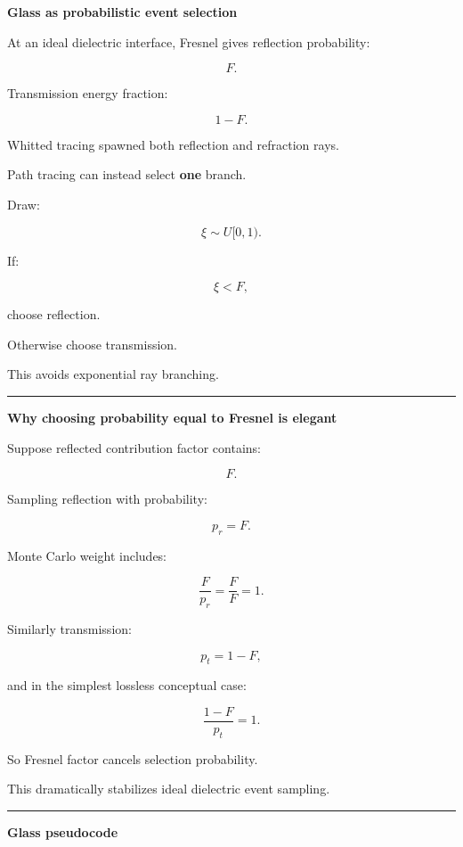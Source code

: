 \textbf{Glass as probabilistic event selection}

At an ideal dielectric interface, Fresnel gives reflection probability:

\[
F.
\]

Transmission energy fraction:

\[
1-F.
\]

Whitted tracing spawned both reflection and refraction rays.

Path tracing can instead select \textbf{one} branch.

Draw:

\[
\xi\sim U[0,1).
\]

If:

\[
\xi<F,
\]

choose reflection.

Otherwise choose transmission.

This avoids exponential ray branching.

\begin{center}\rule{0.5\linewidth}{0.5pt}\end{center}

\textbf{Why choosing probability equal to Fresnel is elegant}

Suppose reflected contribution factor contains:

\[
F.
\]

Sampling reflection with probability:

\[
p_r=F.
\]

Monte Carlo weight includes:

\[
\frac{F}{p_r}
=
\frac{F}{F}
=
1.
\]

Similarly transmission:

\[
p_t=1-F,
\]

and in the simplest lossless conceptual case:

\[
\frac{1-F}{p_t}=1.
\]

So Fresnel factor cancels selection probability.

This dramatically stabilizes ideal dielectric event sampling.

\begin{center}\rule{0.5\linewidth}{0.5pt}\end{center}

\textbf{Glass pseudocode}

